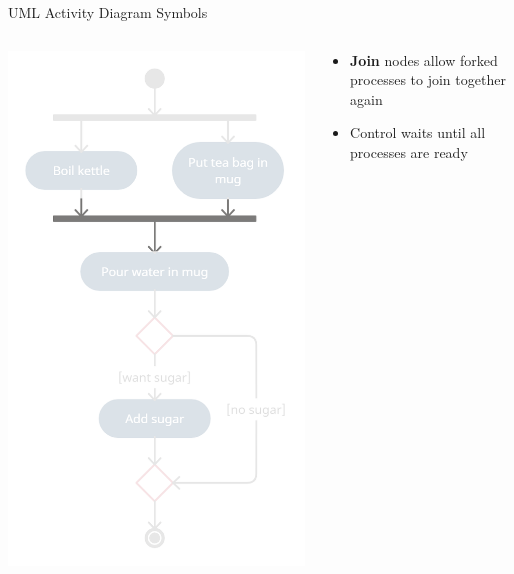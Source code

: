 \begin{frame}{UML Activity Diagram Symbols}
	\begin{columns}
		\begin{column}{0.4\textwidth}
			\includegraphics[width=\textwidth]{ad_join}
		\end{column}
		\begin{column}{0.58\textwidth}
			\begin{itemize}
				\pause\item \textbf{Join} nodes allow forked processes to join together again
				\pause\item Control waits until all processes are ready
			\end{itemize}
		\end{column}
	\end{columns}
\end{frame}


